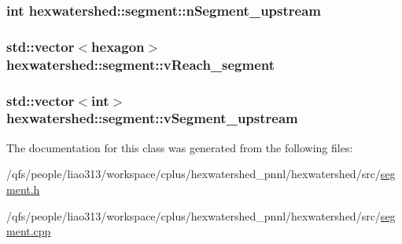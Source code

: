 \hypertarget{classhexwatershed_1_1segment_a0658a0988d360f55942787f8b99096e6}{
\subsubsection[{n\-Segment\-\_\-upstream}]{\setlength{\rightskip}{0pt plus 5cm}int hexwatershed\-::segment\-::n\-Segment\-\_\-upstream}}\label{classhexwatershed_1_1segment_a0658a0988d360f55942787f8b99096e6}
\hypertarget{classhexwatershed_1_1segment_af1d6dedc2a40652967be4b88e3e56882}{
\subsubsection[{v\-Reach\-\_\-segment}]{\setlength{\rightskip}{0pt plus 5cm}std\-::vector$<${\bf hexagon}$>$ hexwatershed\-::segment\-::v\-Reach\-\_\-segment}}\label{classhexwatershed_1_1segment_af1d6dedc2a40652967be4b88e3e56882}
\hypertarget{classhexwatershed_1_1segment_aa318d66f1d6a6d0f7022ad3b4e1485c8}{
\subsubsection[{v\-Segment\-\_\-upstream}]{\setlength{\rightskip}{0pt plus 5cm}std\-::vector$<$int$>$ hexwatershed\-::segment\-::v\-Segment\-\_\-upstream}}\label{classhexwatershed_1_1segment_aa318d66f1d6a6d0f7022ad3b4e1485c8}


The documentation for this class was generated from the following files\-:\begin{DoxyCompactItemize}
\item 
/qfs/people/liao313/workspace/cplus/hexwatershed\-\_\-pnnl/hexwatershed/src/\hyperlink{segment_8h}{segment.\-h}\item 
/qfs/people/liao313/workspace/cplus/hexwatershed\-\_\-pnnl/hexwatershed/src/\hyperlink{segment_8cpp}{segment.\-cpp}\end{DoxyCompactItemize}
